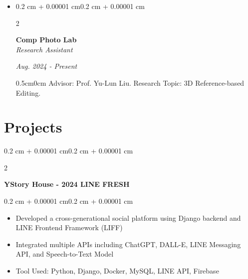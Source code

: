 \documentclass[10pt, letterpaper]{article}
\newenvironment{highlights}{
    \begin{itemize}[
        topsep=0.05 cm,
        parsep=0.05 cm,
        partopsep=0pt,
        itemsep=0pt,
        leftmargin=0.4 cm + 10pt
    ]
}{
    \end{itemize}
}
\newenvironment{onecolentry}{
    \begin{adjustwidth}{0.2 cm + 0.00001 cm}{0.2 cm + 0.00001 cm}
}{
    \end{adjustwidth}
}
\newenvironment{twocolentry}[2][]{
    \onecolentry
    \def\secondColumn{#2}
    \setcolumnwidth{\fill, 4.5 cm}
    \begin{paracol}{2}
}{
    \switchcolumn \raggedleft \secondColumn
    \end{paracol}
    \endonecolentry
}
\let\hrefWithoutArrow\href
\renewcommand{\href}[2]{\hrefWithoutArrow{#1}{\ifthenelse{\equal{#2}{}}{ }{#2 }\raisebox{.15ex}{\footnotesize \faExternalLink*}}}
\begin{document}
\begin{itemize}[leftmargin=0.4cm]
            \item 
                \begin{twocolentry}{\textit{Aug. 2024 - Present}}
                    \textbf{Comp Photo Lab} \\
                    \textit{Research Assistant}
                \end{twocolentry}
                \vspace{-0.15cm}
                \begin{adjustwidth}{0.5cm}{0cm}
                    Advisor: Prof. Yu-Lun Liu. Research Topic: 3D Reference-based Editing.
                \end{adjustwidth}
                \vspace{-0.2cm}
            
            
        \end{itemize}

    \section{Projects}

        \begin{twocolentry}{
        \textit{\href{https://github.com/ChuEating1005/2024-LINE-FRESH}{Link}}}
            \textbf{YStory House - 2024 LINE FRESH} 
        \end{twocolentry}
        \vspace{0.05 cm}
        \begin{onecolentry}
            \begin{highlights}
                \item Developed a cross-generational social platform using Django backend and LINE Frontend Framework (LIFF)
                \item Integrated multiple APIs including ChatGPT, DALL-E, LINE Messaging API, and Speech-to-Text Model
                \item Tool Used: Python, Django, Docker, MySQL, LINE API, Firebase
            \end{highlights}
        \end{onecolentry}
        
\end{document}

